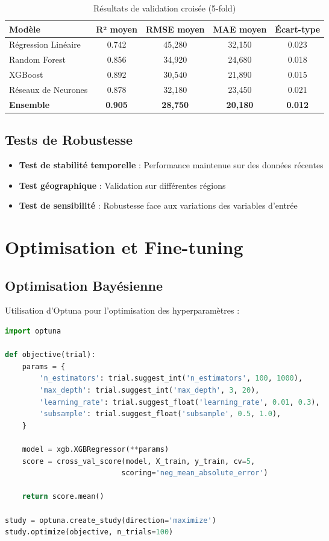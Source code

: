 \begin{table}[H]
\centering
\caption{Résultats de validation croisée (5-fold)}
\begin{tabular}{|l|c|c|c|c|}
\hline
\textbf{Modèle} & \textbf{R² moyen} & \textbf{RMSE moyen} & \textbf{MAE moyen} & \textbf{Écart-type} \\
\hline
Régression Linéaire & 0.742 & 45,280 & 32,150 & 0.023 \\
Random Forest & 0.856 & 34,920 & 24,680 & 0.018 \\
XGBoost & 0.892 & 30,540 & 21,890 & 0.015 \\
Réseaux de Neurones & 0.878 & 32,180 & 23,450 & 0.021 \\
\textbf{Ensemble} & \textbf{0.905} & \textbf{28,750} & \textbf{20,180} & \textbf{0.012} \\
\hline
\end{tabular}
\label{tab:validation_croisee}
\end{table}

\subsection{Tests de Robustesse}

\begin{itemize}
    \item \textbf{Test de stabilité temporelle} : Performance maintenue sur des données récentes
    \item \textbf{Test géographique} : Validation sur différentes régions
    \item \textbf{Test de sensibilité} : Robustesse face aux variations des variables d'entrée
\end{itemize}

\section{Optimisation et Fine-tuning}

\subsection{Optimisation Bayésienne}

Utilisation d'Optuna pour l'optimisation des hyperparamètres :

\begin{lstlisting}[language=Python, caption=Optimisation avec Optuna]
import optuna

def objective(trial):
    params = {
        'n_estimators': trial.suggest_int('n_estimators', 100, 1000),
        'max_depth': trial.suggest_int('max_depth', 3, 20),
        'learning_rate': trial.suggest_float('learning_rate', 0.01, 0.3),
        'subsample': trial.suggest_float('subsample', 0.5, 1.0),
    }
    
    model = xgb.XGBRegressor(**params)
    score = cross_val_score(model, X_train, y_train, cv=5, 
                           scoring='neg_mean_absolute_error')
    
    return score.mean()

study = optuna.create_study(direction='maximize')
study.optimize(objective, n_trials=100)
\end{lstlisting}


